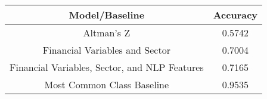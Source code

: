 \footnotesize
\begin{tabular}{cc}
\toprule
Model/Baseline & Accuracy \\
\midrule
Altman's Z & 0.5742 \\
Financial Variables and Sector & 0.7004 \\
Financial Variables, Sector, and NLP Features & 0.7165 \\
Most Common Class Baseline & 0.9535 \\
\bottomrule
\end{tabular}

\normalsize